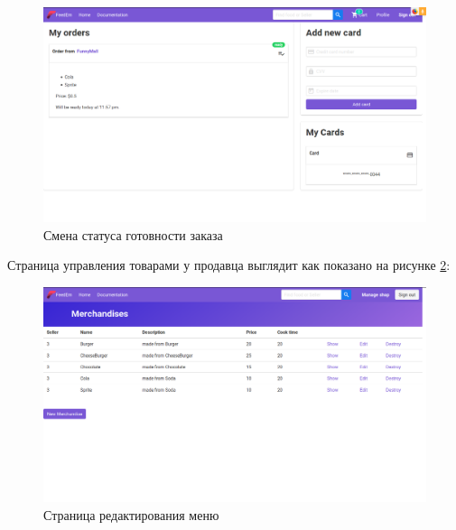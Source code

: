 {  \begin{figure}[H]
    \centering
    \includegraphics[width=\textwidth]{order_ready_customer.png}
    \caption{Смена статуса готовности заказа}
    \label{view_cust_order_ready}
  \end{figure}

  Страница управления товарами у продавца выглядит как показано
  на рисунке \ref{view_seller_manage_merch}:

  \begin{figure}[H]
    \centering
    \includegraphics[width=\textwidth]{seller_manage_merch.png}
    \caption{Страница редактирования меню}
    \label{view_seller_manage_merch}
  \end{figure}
}

\titleformat{\section}{\large\bfseries\centering}{\thesection}{0.5em}{\MakeUppercase}
\titleformat{\subsection}[block]{\bfseries\hspace{1em}}{\thesubsection}{0.5em}{}

